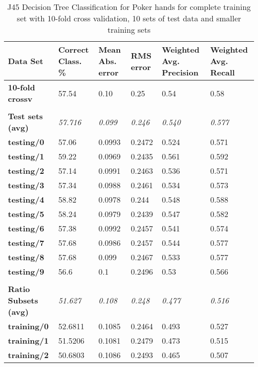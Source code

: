 \documentclass[10pt, a4paper]{article}
\begin{document}
\begin{table}[htbp]
  \centering
  \begin{tabular}{p{3cm}p{1.5cm}p{1.5cm}p{1.5cm}p{1.5cm}p{1.5cm}}
    \toprule
    \textbf{Data Set} & Correct Class. \% & Mean Abs. error & RMS error & Weighted Avg. Precision & Weighted Avg. Recall \\
    \midrule
    \textbf{10-fold crossv} & 57.54 & 0.10  & 0.25  & 0.54  & 0.58 \\
    \textbf{} &       &       &       &       &  \\
    \textbf{Test sets (avg)} & \textit{57.716} & \textit{0.099} & \textit{0.246} & \textit{0.540} & \textit{0.577} \\
    \textbf{   testing/0} & 57.06 & 0.0993 & 0.2472 & 0.524 & 0.571 \\
    \textbf{   testing/1} & 59.22 & 0.0969 & 0.2435 & 0.561 & 0.592 \\
    \textbf{   testing/2} & 57.14 & 0.0991 & 0.2463 & 0.536 & 0.571 \\
    \textbf{   testing/3} & 57.34 & 0.0988 & 0.2461 & 0.534 & 0.573 \\
    \textbf{   testing/4} & 58.82 & 0.0978 & 0.244 & 0.548 & 0.588 \\
    \textbf{   testing/5} & 58.24 & 0.0979 & 0.2439 & 0.547 & 0.582 \\
    \textbf{   testing/6} & 57.38 & 0.0992 & 0.2457 & 0.541 & 0.574 \\
    \textbf{   testing/7} & 57.68 & 0.0986 & 0.2457 & 0.544 & 0.577 \\
    \textbf{   testing/8} & 57.68 & 0.099 & 0.2467 & 0.533 & 0.577 \\
    \textbf{   testing/9} & 56.6  & 0.1   & 0.2496 & 0.53  & 0.566 \\
    \textbf{} &       &       &       &       &  \\
    \textbf{Ratio Subsets (avg)} & \textit{51.627} & \textit{0.108} & \textit{0.248} & \textit{0.477} & \textit{0.516} \\
    \textbf{   training/0} & 52.6811 & 0.1085 & 0.2464 & 0.493 & 0.527 \\
    \textbf{   training/1} & 51.5206 & 0.1081 & 0.2479 & 0.473 & 0.515 \\
    \textbf{   training/2} & 50.6803 & 0.1086 & 0.2493 & 0.465 & 0.507 \\
    \bottomrule
    \end{tabular}%


\caption{J45 Decision Tree Classification for Poker hands for complete training set with 10-fold cross validation, 10 sets of test data and smaller training sets}   
  \label{tab:dtresults}%
\end{table}%
\end{document}
